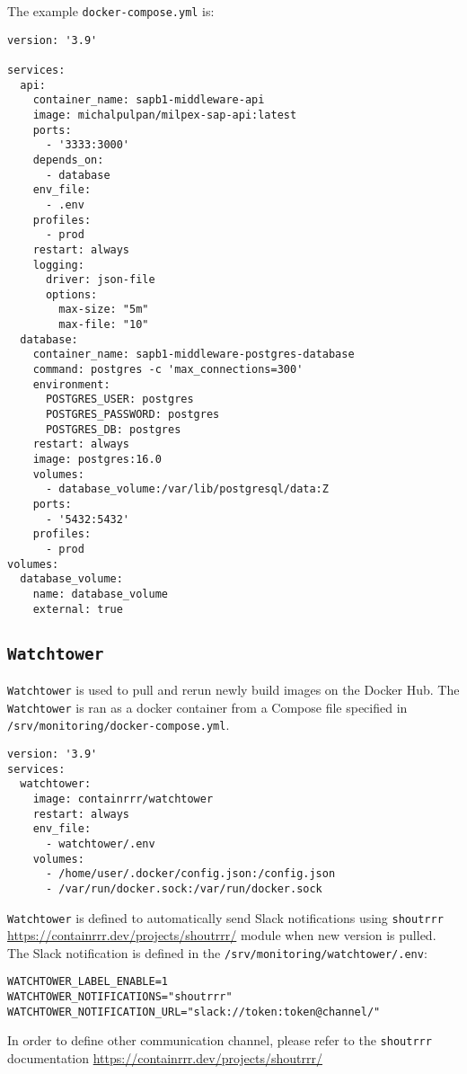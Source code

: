 The example \texttt{docker-compose.yml} is:
\begin{lstlisting}[caption={SAP Business One ServiceLayer Proxy with database connector \texttt{docker-compose.yml}}]
version: '3.9'

services:
  api:
    container_name: sapb1-middleware-api
    image: michalpulpan/milpex-sap-api:latest
    ports:
      - '3333:3000'
    depends_on:
      - database
    env_file:
      - .env
    profiles:
      - prod
    restart: always
    logging:
      driver: json-file
      options:
        max-size: "5m"
        max-file: "10"
  database:
    container_name: sapb1-middleware-postgres-database
    command: postgres -c 'max_connections=300'
    environment:
      POSTGRES_USER: postgres
      POSTGRES_PASSWORD: postgres
      POSTGRES_DB: postgres
    restart: always
    image: postgres:16.0
    volumes:
      - database_volume:/var/lib/postgresql/data:Z
    ports:
      - '5432:5432'
    profiles:
      - prod
volumes:
  database_volume:
    name: database_volume
    external: true
\end{lstlisting}

\subsection{\texttt{Watchtower}}
\texttt{Watchtower} is used to pull and rerun newly build images on the Docker Hub.
The \texttt{Watchtower} is ran as a docker container from a Compose file specified in \texttt{/srv/monitoring/docker-compose.yml}.

\begin{lstlisting}[caption={Watchtower \texttt{docker-compose.yml}}]
version: '3.9'
services:
  watchtower:
    image: containrrr/watchtower
    restart: always
    env_file:
      - watchtower/.env
    volumes:
      - /home/user/.docker/config.json:/config.json
      - /var/run/docker.sock:/var/run/docker.sock
\end{lstlisting}

\texttt{Watchtower} is defined to automatically send Slack notifications using \texttt{shoutrrr} \url{https://containrrr.dev/projects/shoutrrr/} module when new version is pulled. The Slack notification is defined in the \texttt{/srv/monitoring/watchtower/.env}:
\begin{lstlisting}[caption={Watchtower environment variables}]
WATCHTOWER_LABEL_ENABLE=1
WATCHTOWER_NOTIFICATIONS="shoutrrr"
WATCHTOWER_NOTIFICATION_URL="slack://token:token@channel/"
\end{lstlisting}
In order to define other communication channel, please refer to the \texttt{shoutrrr} documentation \url{https://containrrr.dev/projects/shoutrrr/}

